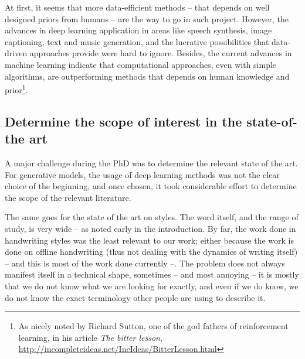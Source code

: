 \par At first, it seems that more data-efficient methods -- that depends on well designed priors from humans -- are the way to go in such project. However, the advances in deep learning application in areas like speech synthesis, image captioning, text and music generation, and the lucrative possibilities that data-driven approaches provide were hard to ignore. Besides, the current advances in machine learning indicate that computational approaches, even with simple algorithms, are outperforming methods that depends on human knowledge and prior\footnote{As nicely noted by Richard Sutton, one of the god fathers of reinforcement learning, in his article \textit{The bitter lesson}, \url{http://incompleteideas.net/IncIdeas/BitterLesson.html}}.

\subsection{Determine the scope of interest in the state-of-the art}

\par A major challenge during the PhD was to determine the relevant state of the art. For generative models, the usage of deep learning methods was not the clear choice of the beginning, and once chosen, it took considerable effort to determine the scope of the relevant literature.

\par The same goes for the state of the art on styles. The word itself, and the range of study, is very wide -- as noted early in the introduction. By far, the work done in handwriting styles was the least relevant to our work; either because the work is done on offline handwriting (thus not dealing with the dynamics of writing itself) -- and this is most of the work done currently --. The problem does not always manifest itself in a technical shape, sometimes -- and most annoying -- it is mostly that we do not know what we are looking for exactly, and even if we do know, we do not know the exact terminology other people are using to describe it.


